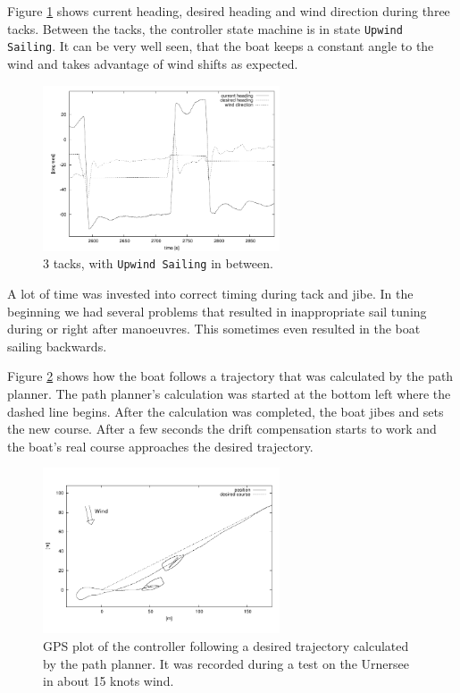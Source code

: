 Figure \ref{fig:3tacks_upwind_sailing} shows current heading, desired heading
and wind direction during three tacks. Between the tacks, the controller state
machine is in state \texttt{Upwind Sailing}. It can be very well seen, that the
boat keeps a constant angle to the wind and takes advantage of wind shifts as
expected.
\begin{figure}[thb]
\centering
\includegraphics[trim = 0mm 0mm 0mm 0mm, clip, width=7cm]{pics/tacks_to_upwind_usee5_wind8kn_hdg.pdf}
\caption{3 tacks, with \texttt{Upwind Sailing} in between.}\label{fig:3tacks_upwind_sailing}
\end{figure}
A lot of time was invested into correct timing during tack and jibe. In the
beginning we had several problems that resulted in inappropriate sail tuning
during or right after manoeuvres. This sometimes even resulted in the boat
sailing backwards.

Figure \ref{fig:wyp_autonom_drift_comp} shows how the boat follows a trajectory
that was calculated by the path planner. The path planner's calculation was started
at the bottom left where the dashed line begins. After the calculation was
completed, the boat jibes and sets the new course. After a few seconds the
drift compensation starts to work and the boat's real course approaches the
desired trajectory.
%
\begin{figure}[thb]
\centering
\includegraphics[trim = 0mm 0mm 0mm 0mm, clip, width=7cm]{pics/driftcompensation.pdf}
\caption{GPS plot of the controller following a desired trajectory calculated
by the path planner. It was recorded during a test on the Urnersee in about 15
knots wind.}\label{fig:wyp_autonom_drift_comp}
\end{figure}

